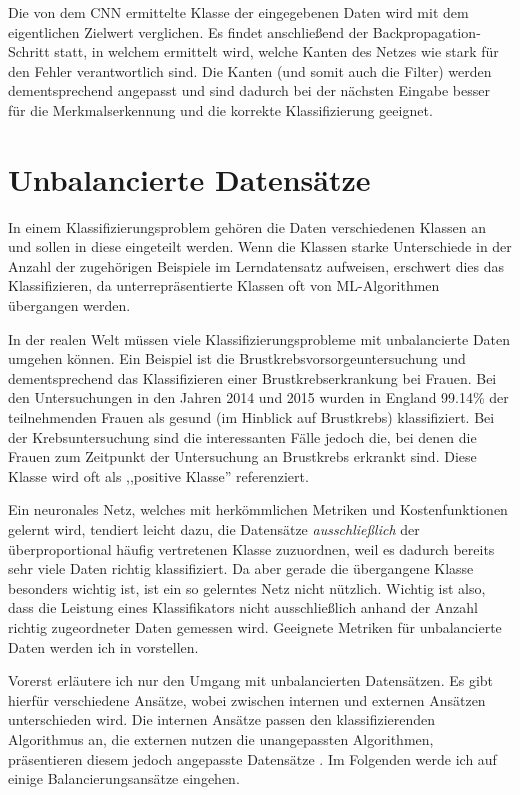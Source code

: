 Die von dem CNN ermittelte Klasse der eingegebenen Daten wird mit dem eigentlichen Zielwert verglichen. Es findet anschließend der Backpropagation-Schritt statt, in welchem ermittelt wird, welche Kanten des Netzes wie stark für den Fehler verantwortlich sind. Die Kanten (und somit auch die Filter) werden dementsprechend angepasst und sind dadurch bei der nächsten Eingabe besser für die Merkmalserkennung und die korrekte Klassifizierung geeignet.

\section{Unbalancierte Datensätze}
 In einem Klassifizierungsproblem gehören die Daten verschiedenen Klassen an und sollen in diese eingeteilt werden. Wenn die Klassen starke Unterschiede in der Anzahl der zugehörigen Beispiele im Lerndatensatz aufweisen, erschwert dies das Klassifizieren, da unterrepräsentierte Klassen oft von ML-Algorithmen übergangen werden.

In der realen Welt müssen viele Klassifizierungsprobleme mit unbalancierte Daten umgehen können. Ein Beispiel ist die  Brustkrebsvorsorgeuntersuchung \citep{breastcancer} und dementsprechend das Klassifizieren einer Brustkrebserkrankung bei Frauen. Bei den Untersuchungen in den Jahren 2014 und 2015 wurden in England 99.14\% der teilnehmenden Frauen als gesund (im Hinblick auf Brustkrebs) klassifiziert. Bei der Krebsuntersuchung sind die interessanten Fälle jedoch die, bei denen die Frauen zum Zeitpunkt der Untersuchung an Brustkrebs erkrankt sind. Diese Klasse wird oft als ,,positive Klasse'' referenziert.

Ein neuronales Netz, welches mit herkömmlichen Metriken und Kostenfunktionen gelernt wird, tendiert leicht dazu, die Datensätze \emph{ausschließlich} der überproportional häufig vertretenen Klasse zuzuordnen, weil es dadurch bereits sehr viele Daten richtig klassifiziert. Da aber gerade die übergangene Klasse besonders wichtig ist, ist ein so gelerntes Netz nicht nützlich. Wichtig ist also, dass die Leistung eines Klassifikators nicht ausschließlich anhand der Anzahl richtig zugeordneter Daten gemessen wird.
Geeignete Metriken für unbalancierte Daten werden ich in  vorstellen.

Vorerst erläutere ich nur den Umgang mit unbalancierten Datensätzen. Es gibt hierfür verschiedene Ansätze, wobei zwischen internen und externen Ansätzen unterschieden wird. Die internen Ansätze passen den klassifizierenden Algorithmus an, die externen nutzen die unangepassten Algorithmen, präsentieren diesem jedoch angepasste Datensätze \citep{resampling}. Im Folgenden werde ich auf einige Balancierungsansätze eingehen.


